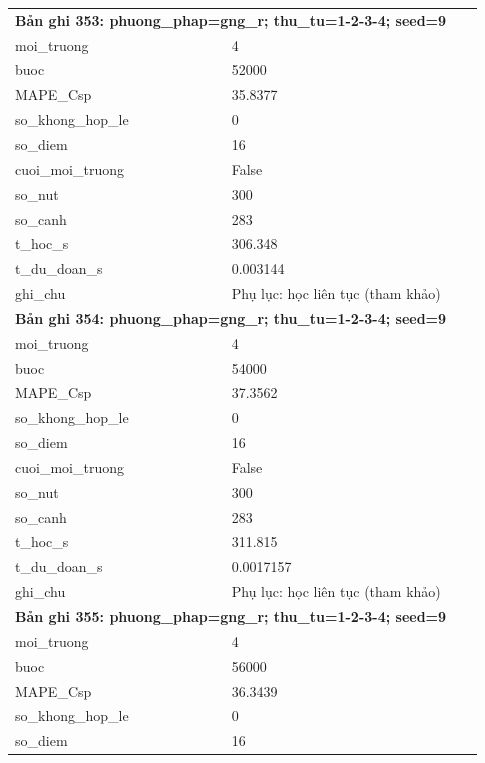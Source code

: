 \begin{longtable}{p{0.43\linewidth}p{0.50\linewidth}}
\midrule
\multicolumn{2}{p{0.95\linewidth}}{\textbf{Bản ghi 353: phuong\_phap=gng\_r; thu\_tu=1-2-3-4; seed=9}} \\
moi\_\allowbreak truong & 4 \\
buoc & 52000 \\
MAPE\_\allowbreak Csp & 35.8377 \\
so\_\allowbreak khong\_\allowbreak hop\_\allowbreak le & 0 \\
so\_\allowbreak diem & 16 \\
cuoi\_\allowbreak moi\_\allowbreak truong & False \\
so\_\allowbreak nut & 300 \\
so\_\allowbreak canh & 283 \\
t\_\allowbreak hoc\_\allowbreak s & 306.348 \\
t\_\allowbreak du\_\allowbreak doan\_\allowbreak s & 0.003144 \\
ghi\_\allowbreak chu & Phụ lục: học liên tục (tham khảo) \\
\midrule
\multicolumn{2}{p{0.95\linewidth}}{\textbf{Bản ghi 354: phuong\_phap=gng\_r; thu\_tu=1-2-3-4; seed=9}} \\
moi\_\allowbreak truong & 4 \\
buoc & 54000 \\
MAPE\_\allowbreak Csp & 37.3562 \\
so\_\allowbreak khong\_\allowbreak hop\_\allowbreak le & 0 \\
so\_\allowbreak diem & 16 \\
cuoi\_\allowbreak moi\_\allowbreak truong & False \\
so\_\allowbreak nut & 300 \\
so\_\allowbreak canh & 283 \\
t\_\allowbreak hoc\_\allowbreak s & 311.815 \\
t\_\allowbreak du\_\allowbreak doan\_\allowbreak s & 0.0017157 \\
ghi\_\allowbreak chu & Phụ lục: học liên tục (tham khảo) \\
\midrule
\multicolumn{2}{p{0.95\linewidth}}{\textbf{Bản ghi 355: phuong\_phap=gng\_r; thu\_tu=1-2-3-4; seed=9}} \\
moi\_\allowbreak truong & 4 \\
buoc & 56000 \\
MAPE\_\allowbreak Csp & 36.3439 \\
so\_\allowbreak khong\_\allowbreak hop\_\allowbreak le & 0 \\
so\_\allowbreak diem & 16 \\

\end{longtable}
